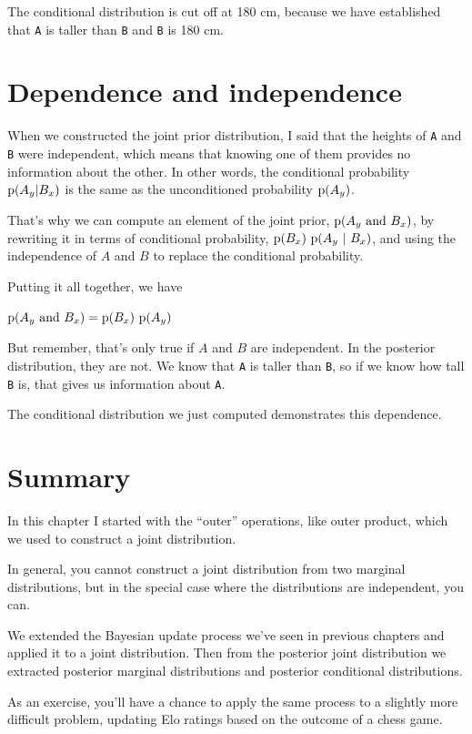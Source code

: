 \documentclass[12pt]{book}
\theoremstyle{exercise}
\newcommand{\py}[1]{{\tt #1}}%
\begin{document}
The conditional distribution is cut off at 180 cm, because we have established that \py{A} is taller than \py{B} and \py{B} is 180 cm.

\section{Dependence and independence}

When we constructed the joint prior distribution, I said that the heights of \py{A} and \py{B} were independent, which means that knowing one of them provides no information about the other.
In other words, the conditional probability $\mathrm{p}(A_y | B_x)$ is the same as the unconditioned probability $\mathrm{p}(A_y)$.

That's why we can compute an element of the joint prior, $\mathrm{p}(A_y~\mathrm{and}~B_x)$, by rewriting it in terms of conditional probability, $\mathrm{p}(B_x)~\mathrm{p}(A_y~|~B_x)$, and using the independence of $A$ and $B$ to replace the conditional probability.

Putting it all together, we have

$\mathrm{p}(A_y~\mathrm{and}~B_x) = \mathrm{p}(B_x)~\mathrm{p}(A_y)$

But remember, that's only true if $A$ and $B$ are independent.
In the posterior distribution, they are not.
We know that \py{A} is taller than \py{B}, so if we know how tall \py{B} is, that gives us information about \py{A}.

The conditional distribution we just computed demonstrates this dependence.


\section{Summary}

In this chapter I started with the ``outer'' operations, like outer product, which we used to construct a joint distribution.

In general, you cannot construct a joint distribution from two marginal distributions, but in the special case where the distributions are independent, you can.

We extended the Bayesian update process we've seen in previous chapters and applied it to a joint distribution.  Then from the posterior joint distribution we extracted posterior marginal distributions and posterior conditional distributions.

As an exercise, you'll have a chance to apply the same process to a slightly more difficult problem, updating Elo ratings based on the outcome of a chess game.
\end{document}
